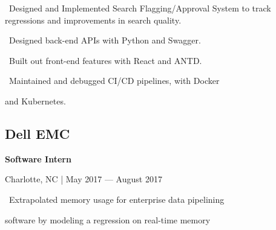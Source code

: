 \documentclass{article}
\begin{document}
\begin{minipage}[t][0pt]{8in\linewidth}
\begin{minipage}[t]{0.45\textwidth\hspace{0in}}
\begin{minipage}[t]{3.75in\textwidth\hspace{0in}}
            \vspace{0.3em}
            \hspace{1em}\textasteriskcentered \, \mdseries\textrm{Designed and Implemented Search Flagging/Approval System to track regressions and improvements in search quality.}

            \vspace{0.3em}
            \hspace{1em}\textasteriskcentered \, \mdseries\textrm{Designed back-end APIs with Python and Swagger.}

            \vspace{0.3em}
            \hspace{1em}\textasteriskcentered \, \mdseries\textrm{Built out front-end features with React and ANTD.}

            \vspace{0.3em}
            \hspace{1em}\textasteriskcentered \, \mdseries\textrm{Maintained and debugged CI/CD pipelines, with Docker}

            \hspace{1.6em} and Kubernetes.
        \end{minipage}

        \vspace{0.3em}
        \subsection{Dell EMC}
        \vspace{-0.5em}\hspace{0.1em}
        \mdseries\bfseries{Software Intern}
        \vspace{0.1em}
        
        \hspace{0.5em}\mdseries\textrm{Charlotte, NC | May 2017 — August 2017}

        \vspace{-0.4em}
        \begin{minipage}[t]{3.75in\textwidth\hspace{0in}}
            \vspace{0.1em}
            \hspace{1em}\textasteriskcentered \, \mdseries\textrm{Extrapolated memory usage for enterprise data pipelining} 
            
            \hspace{1.6em} software by modeling a regression on real-time memory 
            

\end{minipage}
\end{minipage}
\end{minipage}
\end{document}
